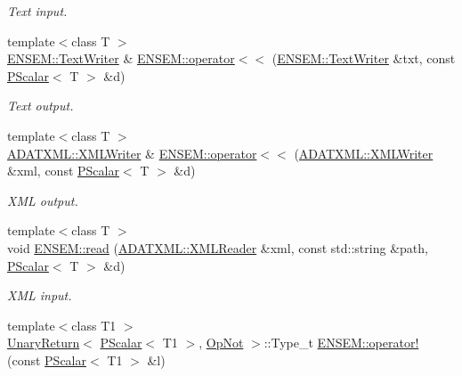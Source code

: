 \begin{DoxyCompactItemize}
\begin{DoxyCompactList}\small\item\em Text input. \end{DoxyCompactList}\item 
{\footnotesize template$<$class T $>$ }\\\mbox{\hyperlink{classENSEM_1_1TextWriter}{E\+N\+S\+E\+M\+::\+Text\+Writer}} \& \mbox{\hyperlink{group__primscalar_gaa851ed6964c4ac3ce548dfb95692f221}{E\+N\+S\+E\+M\+::operator$<$$<$}} (\mbox{\hyperlink{classENSEM_1_1TextWriter}{E\+N\+S\+E\+M\+::\+Text\+Writer}} \&txt, const \mbox{\hyperlink{classENSEM_1_1PScalar}{P\+Scalar}}$<$ T $>$ \&d)
\begin{DoxyCompactList}\small\item\em Text output. \end{DoxyCompactList}\item 
{\footnotesize template$<$class T $>$ }\\\mbox{\hyperlink{classADATXML_1_1XMLWriter}{A\+D\+A\+T\+X\+M\+L\+::\+X\+M\+L\+Writer}} \& \mbox{\hyperlink{group__primscalar_ga7c71fa022421c2fa564d74338851def4}{E\+N\+S\+E\+M\+::operator$<$$<$}} (\mbox{\hyperlink{classADATXML_1_1XMLWriter}{A\+D\+A\+T\+X\+M\+L\+::\+X\+M\+L\+Writer}} \&xml, const \mbox{\hyperlink{classENSEM_1_1PScalar}{P\+Scalar}}$<$ T $>$ \&d)
\begin{DoxyCompactList}\small\item\em X\+ML output. \end{DoxyCompactList}\item 
{\footnotesize template$<$class T $>$ }\\void \mbox{\hyperlink{group__primscalar_ga882ac6046905c4b049ed86cd7668b32a}{E\+N\+S\+E\+M\+::read}} (\mbox{\hyperlink{classADATXML_1_1XMLReader}{A\+D\+A\+T\+X\+M\+L\+::\+X\+M\+L\+Reader}} \&xml, const std\+::string \&path, \mbox{\hyperlink{classENSEM_1_1PScalar}{P\+Scalar}}$<$ T $>$ \&d)
\begin{DoxyCompactList}\small\item\em X\+ML input. \end{DoxyCompactList}\item 
{\footnotesize template$<$class T1 $>$ }\\\mbox{\hyperlink{structENSEM_1_1UnaryReturn}{Unary\+Return}}$<$ \mbox{\hyperlink{classENSEM_1_1PScalar}{P\+Scalar}}$<$ T1 $>$, \mbox{\hyperlink{structENSEM_1_1OpNot}{Op\+Not}} $>$\+::Type\+\_\+t \mbox{\hyperlink{group__primscalar_gafea5191a2ebdc35856d62d9284d246be}{E\+N\+S\+E\+M\+::operator!}} (const \mbox{\hyperlink{classENSEM_1_1PScalar}{P\+Scalar}}$<$ T1 $>$ \&l)

\end{DoxyCompactItemize}
